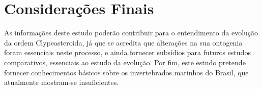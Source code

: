\chapter{Considerações Finais}

As informações deste estudo poderão contribuir para o entendimento da evolução da ordem Clypeasteroida, já que se acredita que alterações na sua ontogenia foram essenciais neste processo, e ainda fornecer subsídios para futuros estudos comparativos, essenciais ao estudo da evolução. Por fim, este estudo pretende fornecer conhecimentos básicos sobre os invertebrados marinhos do Brasil, que atualmente mostram-se insuficientes.
